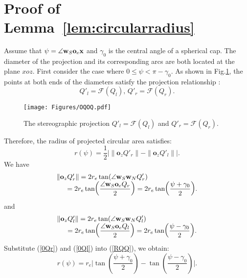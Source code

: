 \documentclass[final]{IEEEtran}
\begin{document}
\section{Proof of Lemma~\ref{lem:circularradius}}\label{app:circularradius}
\indent Assume that $\psi=\angle\textbf{w}_S \textbf{o}_e \textbf{x}$ and $\gamma_0$ is the central angle of a spherical cap. The diameter of the projection and its corresponding arcs are both located at the plane $xoz$. First consider the case where $0\leq \psi< \pi-\gamma_0$. As shown in Fig.\ref{fig:OQOQ}, the points at both ends of the diameters satisfy the projection relationship
:
\begin{equation}
    Q'_{l}=\mathcal{F}(Q_{l}),\,Q'_{r}=\mathcal{F}(Q_{r}).
\end{equation}
\begin{figure}
    \centering
    \texttt{[image: Figures/OQOQ.pdf]}
    \caption{The stereographic projection $Q'_{l}=\mathcal{F}(Q_{l})$ and $Q'_{r}=\mathcal{F}(Q_{r})$. }
    \label{fig:OQOQ}
\end{figure}
Therefore, the radius of projected circular area satisfies:
\begin{equation}
    r(\psi)=\frac{1}{2}\bigg|\|\textbf{o}_z Q'_{r}\|-\|\textbf{o}_z Q'_{l}\|\bigg|.
\label{RQQ}
\end{equation}
\indent We have
\begin{equation}
\begin{array}{r@{}l}
    \|\textbf{o}_z& Q'_{r}\|\displaystyle=2r_e \tan(\angle \textbf{w}_S \textbf{w}_N Q'_{r})\\
    &\displaystyle=2r_e \tan(\frac{\angle \textbf{w}_S \textbf{o}_e Q_{r}}{2})\displaystyle=2r_e \tan(\frac{\psi+\gamma_0}{2}).
\end{array}
\label{0Qr}
\end{equation}
and 
\begin{equation}
\begin{array}{r@{}l}
    \|\textbf{o}_z& Q'_{l}\|\displaystyle=2r_e \tan(\angle \textbf{w}_S \textbf{w}_N Q'_{l})\\
    &\displaystyle=2r_e \tan(\frac{\angle \textbf{w}_S \textbf{o}_e Q_{l}}{2})\displaystyle=2r_e \tan(\frac{\psi-\gamma_0}{2}).
\end{array}
\label{0Ql}
\end{equation}
\indent Substitute (\ref{0Qr}) and (\ref{0Ql}) into (\ref{RQQ}), we obtain:
\begin{equation}
    r(\psi)=r_e\bigg|\tan(\frac{\psi+\gamma_0}{2})-\tan(\frac{\psi-\gamma_0}{2})\bigg|.    
\label{rpsi}
\end{equation}
\end{document}
